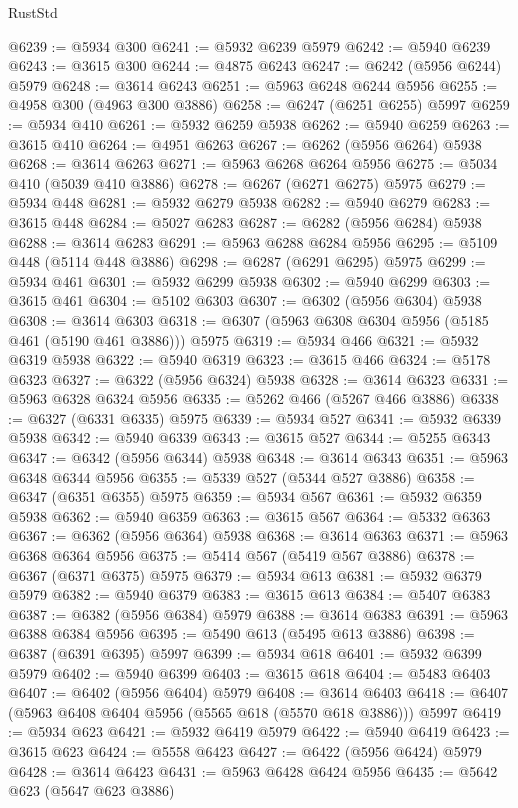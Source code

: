\begin{lexlean}{RustStd}
\begin{coremodule}
@6239 := @5934 @300
@6241 := @5932 @6239 @5979
@6242 := @5940 @6239
@6243 := @3615 @300
@6244 := @4875 @6243
@6247 := @6242 (@5956 @6244) @5979
@6248 := @3614 @6243
@6251 := @5963 @6248 @6244 @5956
@6255 := @4958 @300 (@4963 @300 @3886)
@6258 := @6247 (@6251 @6255) @5997
@6259 := @5934 @410
@6261 := @5932 @6259 @5938
@6262 := @5940 @6259
@6263 := @3615 @410
@6264 := @4951 @6263
@6267 := @6262 (@5956 @6264) @5938
@6268 := @3614 @6263
@6271 := @5963 @6268 @6264 @5956
@6275 := @5034 @410 (@5039 @410 @3886)
@6278 := @6267 (@6271 @6275) @5975
@6279 := @5934 @448
@6281 := @5932 @6279 @5938
@6282 := @5940 @6279
@6283 := @3615 @448
@6284 := @5027 @6283
@6287 := @6282 (@5956 @6284) @5938
@6288 := @3614 @6283
@6291 := @5963 @6288 @6284 @5956
@6295 := @5109 @448 (@5114 @448 @3886)
@6298 := @6287 (@6291 @6295) @5975
@6299 := @5934 @461
@6301 := @5932 @6299 @5938
@6302 := @5940 @6299
@6303 := @3615 @461
@6304 := @5102 @6303
@6307 := @6302 (@5956 @6304) @5938
@6308 := @3614 @6303
@6318 := @6307 (@5963 @6308 @6304 @5956 (@5185 @461 (@5190 @461 @3886))) @5975
@6319 := @5934 @466
@6321 := @5932 @6319 @5938
@6322 := @5940 @6319
@6323 := @3615 @466
@6324 := @5178 @6323
@6327 := @6322 (@5956 @6324) @5938
@6328 := @3614 @6323
@6331 := @5963 @6328 @6324 @5956
@6335 := @5262 @466 (@5267 @466 @3886)
@6338 := @6327 (@6331 @6335) @5975
@6339 := @5934 @527
@6341 := @5932 @6339 @5938
@6342 := @5940 @6339
@6343 := @3615 @527
@6344 := @5255 @6343
@6347 := @6342 (@5956 @6344) @5938
@6348 := @3614 @6343
@6351 := @5963 @6348 @6344 @5956
@6355 := @5339 @527 (@5344 @527 @3886)
@6358 := @6347 (@6351 @6355) @5975
@6359 := @5934 @567
@6361 := @5932 @6359 @5938
@6362 := @5940 @6359
@6363 := @3615 @567
@6364 := @5332 @6363
@6367 := @6362 (@5956 @6364) @5938
@6368 := @3614 @6363
@6371 := @5963 @6368 @6364 @5956
@6375 := @5414 @567 (@5419 @567 @3886)
@6378 := @6367 (@6371 @6375) @5975
@6379 := @5934 @613
@6381 := @5932 @6379 @5979
@6382 := @5940 @6379
@6383 := @3615 @613
@6384 := @5407 @6383
@6387 := @6382 (@5956 @6384) @5979
@6388 := @3614 @6383
@6391 := @5963 @6388 @6384 @5956
@6395 := @5490 @613 (@5495 @613 @3886)
@6398 := @6387 (@6391 @6395) @5997
@6399 := @5934 @618
@6401 := @5932 @6399 @5979
@6402 := @5940 @6399
@6403 := @3615 @618
@6404 := @5483 @6403
@6407 := @6402 (@5956 @6404) @5979
@6408 := @3614 @6403
@6418 := @6407 (@5963 @6408 @6404 @5956 (@5565 @618 (@5570 @618 @3886))) @5997
@6419 := @5934 @623
@6421 := @5932 @6419 @5979
@6422 := @5940 @6419
@6423 := @3615 @623
@6424 := @5558 @6423
@6427 := @6422 (@5956 @6424) @5979
@6428 := @3614 @6423
@6431 := @5963 @6428 @6424 @5956
@6435 := @5642 @623 (@5647 @623 @3886)

\end{coremodule}
\end{lexlean}
